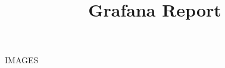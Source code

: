 \documentclass{article}
\begin{document}
\title{Grafana Report}
\author{}
\date{}

\maketitle

{{IMAGES}}
\end{document}
